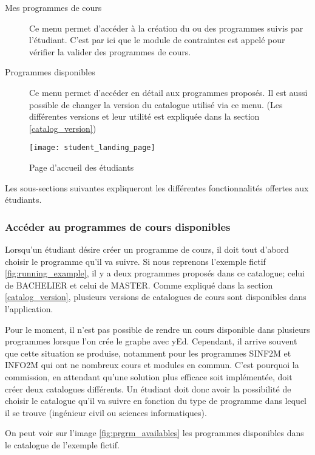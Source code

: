 \begin{description}
  \item[Mes programmes de cours] Ce menu permet d'accéder à la création du ou des programmes suivis par l'étudiant. C'est par ici que le module de contraintes est appelé pour vérifier la valider des programmes de cours. 
  \item[Programmes disponibles] Ce menu permet d'accéder en détail aux programmes proposés. Il est aussi possible de changer la version du catalogue utilisé via ce menu. (Les différentes versions et leur utilité est expliquée dans la section \ref{catalog_version})
\end{description}
\begin{figure}
\centering
\caption{Page d’accueil des étudiants}
\label{fig:student_landing_page}
\texttt{[image: student\_landing\_page]}
\end{figure}

Les sous-sections suivantes expliqueront les différentes fonctionnalités offertes aux étudiants. 

\subsubsection{Accéder au programmes de cours disponibles}

Lorsqu'un étudiant désire créer un programme de cours, il doit tout d'abord choisir le programme qu'il va suivre. Si nous reprenons l'exemple fictif \ref{fig:running_example}, il y a deux programmes proposés dans ce catalogue; celui de BACHELIER et celui de MASTER. Comme expliqué dans la section \ref{catalog_version}, plusieurs versions de catalogues de cours sont disponibles dans l'application. 

Pour le moment, il n'est pas possible de rendre un cours disponible dans plusieurs programmes lorsque l'on crée le graphe avec yEd. Cependant, il arrive souvent que cette situation se produise, notamment pour les programmes SINF2M et INFO2M qui ont ne nombreux cours et modules en commun. C'est pourquoi la commission, en attendant qu'une solution plus efficace soit implémentée, doit créer deux catalogues différents. Un étudiant doit donc avoir la possibilité de choisir le catalogue qu'il va suivre en fonction du type de programme dans lequel il se trouve (ingénieur civil ou sciences informatiques).

On peut voir sur l'image \ref{fig:prgrm_availables} les programmes disponibles dans le catalogue de l'exemple fictif. 

